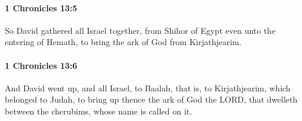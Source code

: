 		\paragraph{1 Chronicles 13:5} %
			\label{1CHRONICLES-13-5}

			So David gathered all Israel together, from Shihor of Egypt even unto the entering of Hemath, to bring the ark of God from Kirjathjearim.


		\paragraph{1 Chronicles 13:6} %
			\label{1CHRONICLES-13-6}

			And David went up, and all Israel, to Baalah, that is, to Kirjathjearim, which belonged to Judah, to bring up thence the ark of God the LORD, that dwelleth between the cherubims, whose name is called on it.


